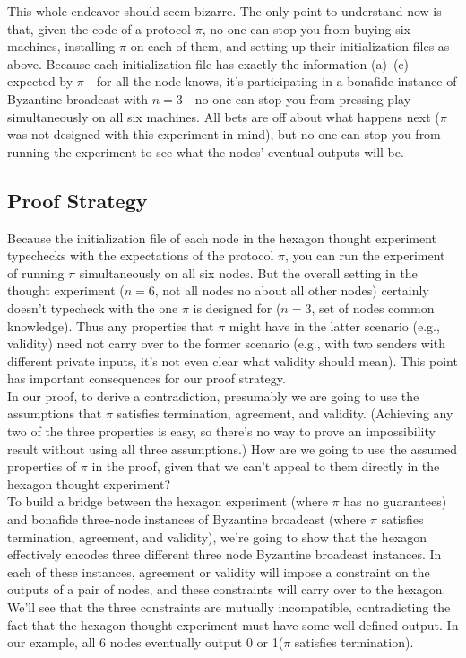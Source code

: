 This whole endeavor should seem bizarre. The only point to understand now is that, given
the code of a protocol $\pi$, no one can stop you from buying six machines, installing $\pi$ on each
of them, and setting up their initialization files as above. Because each initialization file has
exactly the information (a)–(c) expected by $\pi$—for all the node knows, it’s participating in
a bonafide instance of Byzantine broadcast with $n = 3$—no one can stop you from pressing
play simultaneously on all six machines. All bets are off about what happens next ($\pi$ was
not designed with this experiment in mind), but no one can stop you from running the
experiment to see what the nodes’ eventual outputs will be.

\subsection{Proof Strategy}
Because the initialization file of each node in the hexagon thought experiment typechecks with the expectations of the protocol $\pi$, you can run the experiment of running $\pi$ simultaneously on all six nodes. But the overall setting in the thought experiment
($n = 6$, not all nodes no about all other nodes) certainly doesn't typecheck with the one $\pi$ is designed
for ($n = 3$, set of nodes common knowledge). Thus any properties that $\pi$ might have in
the latter scenario (e.g., validity) need not carry over to the former scenario (e.g., with two
senders with different private inputs, it’s not even clear what validity should mean). This
point has important consequences for our proof strategy.\\
In our proof, to derive a contradiction, presumably we are going to use the assumptions that $\pi$ satisfies termination, agreement, and validity. (Achieving any two of the three
properties is easy, so there’s no way to prove an impossibility result without using all three
assumptions.) How are we going to use the assumed properties of $\pi$ in the proof, given that
we can’t appeal to them directly in the hexagon thought experiment?\\
To build a bridge between the hexagon experiment (where $\pi$ has no guarantees) and bonafide three-node instances of Byzantine broadcast (where $\pi$ satisfies termination, agreement,
and validity), we’re going to show that the hexagon effectively encodes three different three node Byzantine broadcast instances. In each of these instances, agreement or validity will impose a constraint on the outputs of a pair of nodes, and these constraints will carry over to
the hexagon. We’ll see that the three constraints are mutually incompatible, contradicting
the fact that the hexagon thought experiment must have some well-defined output. In our example, all 6 nodes eventually output 0 or 1($\pi$ satisfies termination).


